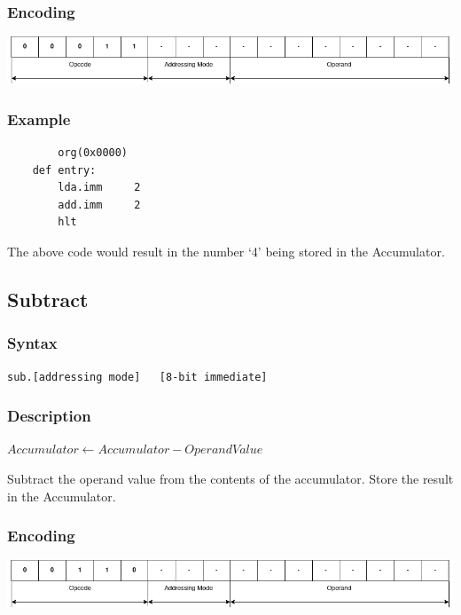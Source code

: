     \subsubsection{Encoding}
    \begin{center}
        \includegraphics[scale=0.40]{img/Andromeda-ADD.drawio}
    \end{center}

    \subsubsection{Example}
    \begin{verbatim}
        org(0x0000)
    def entry:
        lda.imm     2
        add.imm     2
        hlt
    \end{verbatim}
    \par The above code would result in the number `4' being stored in the Accumulator.

\pagebreak
\subsection{Subtract}\label{subsec:sub}
    \subsubsection{Syntax}
    \begin{verbatim}sub.[addressing mode]   [8-bit immediate]\end{verbatim}

    \subsubsection{Description}
    $Accumulator \leftarrow Accumulator - OperandValue$
    \par Subtract the operand value from the contents of the accumulator.
    Store the result in the Accumulator.

    \subsubsection{Encoding}
    \begin{center}
        \includegraphics[scale=0.40]{img/Andromeda-SUB.drawio}
    \end{center}

